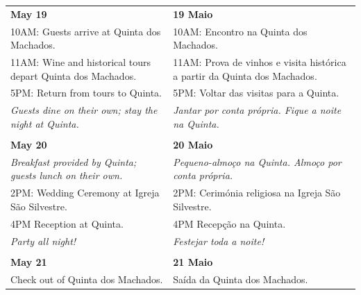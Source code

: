 \documentclass[6pt]{article}
\begin{document}
\pagestyle{empty}

\small 
\begin{tabular}{p{2in}|p{2in}}
  \textbf{May 19} & \textbf{19 Maio} \\
  {10AM:} Guests arrive at Quinta dos Machados.
  &
  {10AM:} Encontro na Quinta dos Machados.\\
  {11AM:} Wine and historical tours depart Quinta dos Machados. 
  &
  {11AM:} Prova de vinhos e visita histórica a partir da Quinta dos Machados.\\
  {5PM:} Return from tours to Quinta.
  &
  {5PM:} Voltar das visitas para a Quinta.
  \\
  {\it Guests dine on their own; stay the night at Quinta.}
  &
  {\it Jantar por conta própria. Fique a noite na Quinta.}\\
  &\\
  {\bf May 20} & {\bf 20 Maio} \\
  {\it Breakfast provided by Quinta; guests lunch on their own.}
  &
  {\it Pequeno-almoço na Quinta. Almoço por conta própria.}
  \\
  {2PM:} Wedding Ceremony at Igreja São Silvestre.
  &
  {2PM}: Cerimónia religiosa na Igreja São Silvestre.
  \\
  {4PM} Reception at Quinta.
  &
  {4PM} Recepção na Quinta.
  \\
  {\it Party all night!}&{\it Festejar toda a noite!}
  \\
  &\\
  {\bf May 21} & {\bf 21 Maio} \\
  Check out of Quinta dos Machados. & Saída da Quinta dos Machados.\\
\end{tabular}
\end{document}
